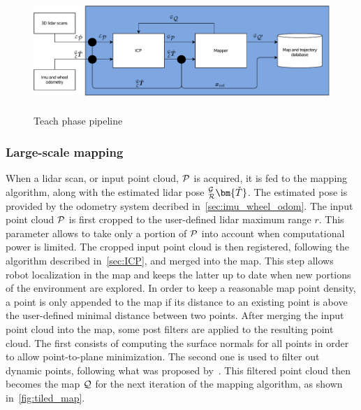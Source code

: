 \begin{figure} [htpb]
	\centering
	\includegraphics[height=1.8in]{figs/teach_pipeline/teach_pipeline.pdf}
	\caption{Teach phase pipeline}
	\label{fig:teach_pipeline}
\end{figure}

\subsubsection{Large-scale mapping}
\label{sec:tiled_map}


When a lidar scan, or input point cloud, $\mathcal{P}$ is acquired, it is fed to the mapping algorithm, along with the estimated lidar pose $_{\robotf}^{\mapf}\bm{\check{T}}$. %
The estimated pose is provided by the odometry system decribed in~\autoref{sec:imu_wheel_odom}.
The input point cloud  $\mathcal{P}$ is first cropped to the user-defined lidar maximum range $r$. %
This parameter allows to take only a portion of $\mathcal{P}$ into account when computational power is limited.
The cropped input point cloud is then registered, following the algorithm described in~\autoref{sec:ICP}, and merged into the map.
This step allows robot localization in the map and keeps the latter up to date when new portions of the environment are explored.
In order to keep a reasonable map point density, a point is only appended to the map if its distance to an existing point is above the user-defined minimal distance between two points.
After merging the input point cloud into the map, some post filters are applied to the resulting point cloud.
The first consists of computing the surface normals for all points in order to allow point-to-plane minimization.
The second one is used to filter out dynamic points, following what was proposed by~\citet{Pomerleau2014}.
This filtered point cloud then becomes the map $\mathcal{Q}$ for the next iteration of the mapping algorithm, as shown in~\autoref{fig:tiled_map}.

